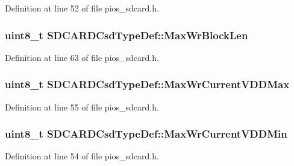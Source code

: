 \-Definition at line 52 of file pios\-\_\-sdcard.\-h.

\hypertarget{group___p_i_o_s___s_d_c_a_r_d_gac00127b98cb9a3a0e1a0bc7960570992}{
\subsubsection[{\-Max\-Wr\-Block\-Len}]{\setlength{\rightskip}{0pt plus 5cm}uint8\-\_\-t {\bf \-S\-D\-C\-A\-R\-D\-Csd\-Type\-Def\-::\-Max\-Wr\-Block\-Len}}}\label{group___p_i_o_s___s_d_c_a_r_d_gac00127b98cb9a3a0e1a0bc7960570992}


\-Definition at line 63 of file pios\-\_\-sdcard.\-h.

\hypertarget{group___p_i_o_s___s_d_c_a_r_d_gab98289ea1b8bc4b5e7fee1820487c07c}{
\subsubsection[{\-Max\-Wr\-Current\-V\-D\-D\-Max}]{\setlength{\rightskip}{0pt plus 5cm}uint8\-\_\-t {\bf \-S\-D\-C\-A\-R\-D\-Csd\-Type\-Def\-::\-Max\-Wr\-Current\-V\-D\-D\-Max}}}\label{group___p_i_o_s___s_d_c_a_r_d_gab98289ea1b8bc4b5e7fee1820487c07c}


\-Definition at line 55 of file pios\-\_\-sdcard.\-h.

\hypertarget{group___p_i_o_s___s_d_c_a_r_d_ga592f9aec07e72eed97e1f28155f23ab4}{
\subsubsection[{\-Max\-Wr\-Current\-V\-D\-D\-Min}]{\setlength{\rightskip}{0pt plus 5cm}uint8\-\_\-t {\bf \-S\-D\-C\-A\-R\-D\-Csd\-Type\-Def\-::\-Max\-Wr\-Current\-V\-D\-D\-Min}}}\label{group___p_i_o_s___s_d_c_a_r_d_ga592f9aec07e72eed97e1f28155f23ab4}


\-Definition at line 54 of file pios\-\_\-sdcard.\-h.

